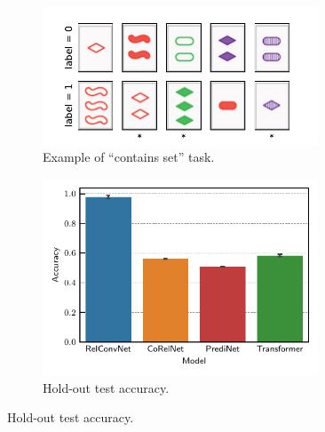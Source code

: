 \begin{figure}[ht]
    \vskip-10pt
    \centering
    \begin{subfigure}[t]{0.5\textwidth}
        \centering
        \includegraphics[width=0.9\textwidth]{figs/contains_set_example.pdf}
        \caption{Example of ``contains set'' task.}\label{fig:contains_set_example}
    \end{subfigure}
    \begin{subfigure}[t]{0.4\textwidth}
        \centering
        \includegraphics[width=0.9\textwidth]{figs/experiments/contains_set_acc.pdf}
        \caption{\footnotesize{Hold-out test accuracy.}}\label{fig:contains_set_acc}
    \end{subfigure}


\end{figure}
